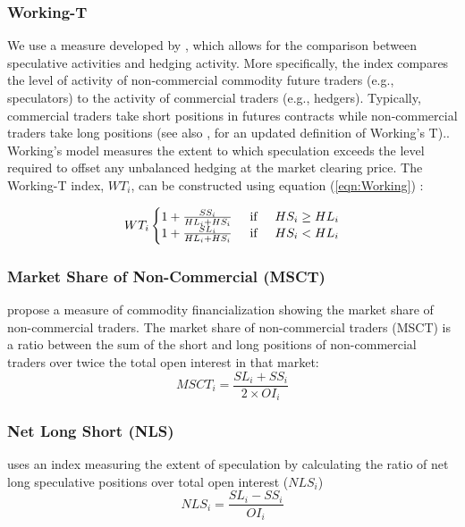 \documentclass[12pt]{article}
\begin{document}
\subsubsection{Working-T}
We use a measure developed by \citet{working1960speculation}, which allows for the comparison between speculative activities and hedging activity. More specifically, the index compares the level of activity of non-commercial commodity future traders (e.g., speculators) to the activity of commercial traders (e.g., hedgers). Typically, commercial traders take short positions in futures contracts while non-commercial traders take long positions (see also \citet{shanker2017new}, for an updated definition of Working’s T).. Working’s model measures the extent to which speculation exceeds the level required to offset any unbalanced hedging at the market clearing price. 
The Working-T index, $WT_i$, can be constructed using equation (\ref{eqn:Working}) :

\begin{equation} \label{eqn:Working}
WT_i\left\{\begin{matrix}
 1+\frac{SS_i}{HL_i+HS_i} \hspace{0.5cm} \mbox{if} \hspace{0.5cm} HS_i \ge HL_i\\
1+\frac{SL_i}{HL_i+HS_i} \hspace{0.5cm} \mbox{if} \hspace{0.5cm} HS_i < HL_i
\end{matrix}\right.
\end{equation}


\subsubsection{Market Share of Non-Commercial (MSCT)}
\citet{buyukcsahin2014speculators} propose a measure of commodity financialization showing the market share of non-commercial traders. The market share of non-commercial traders (MSCT) is a ratio between the sum of the short and long positions of non-commercial traders over twice the total open interest in that market: 
\begin{equation} \label{eqn:MSCT}
MSCT_i=\frac{SL_i+SS_i}{2 \times OI_i}
\end{equation}

\subsubsection{Net Long Short (NLS)}
\citet{hedegaard2011margins} uses an index measuring the extent of speculation by calculating the ratio of net long speculative positions over total open interest ($NLS_i$)
\begin{equation} \label{eqn:NLS}
NLS_i=\frac{SL_i-SS_i}{OI_i}
\end{equation}
\end{document}
